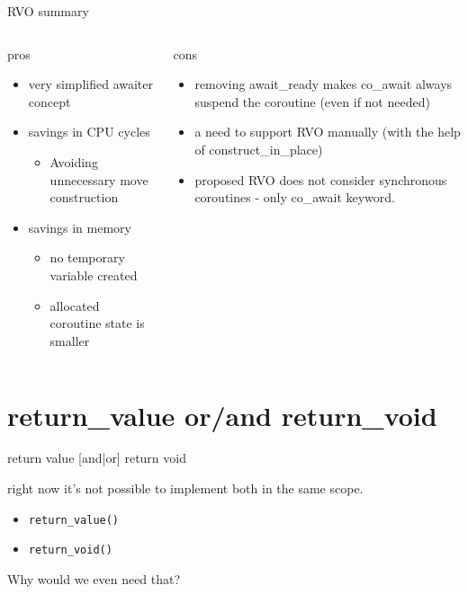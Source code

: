 \documentclass[10pt]{beamer}
\begin{document}
\begin{frame}{RVO summary}
\begin{columns}[T]

\begin{column}{0.48\linewidth}
\centerline{pros}
\begin{itemize}[<+-| alert@+>]
	\item very simplified awaiter concept
	\item savings in CPU cycles
	\begin{itemize}
		\item Avoiding unnecessary move construction
	\end{itemize}
	\item savings in memory
	\begin{itemize}
		\item no temporary variable created
		\item allocated coroutine state is smaller
	\end{itemize}
\end{itemize}
\end{column}
\begin{column}{0.48\linewidth}
\centerline{cons}
\begin{itemize}[<+-| alert@+>]
	\item removing \alert{await\_ready} makes \alert{co\_await} always suspend the coroutine (even if not needed)
	\item a need to support RVO manually (with the help of \alert{construct\_in\_place})
	\item proposed RVO does not consider synchronous coroutines - only \alert{co\_await} keyword.
\end{itemize}
\end{column}
\end{columns}

\end{frame}

\section{return\_value or/and return\_void}

\begin{frame}{return value [and|or] return void}

\vfill

right now it's not possible to implement both in the same scope.

\begin{itemize}
	\item \texttt{return\_value()}
	\item \texttt{return\_void()}
\end{itemize}

\pause

\centerline{\alert{Why would we even need that?}}

\end{frame}
\end{document}
